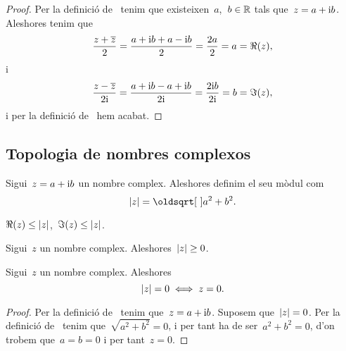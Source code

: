 \documentclass[../Apunts.tex]{subfiles}
\begin{document}
    \begin{proof}
        Per la definició de~ tenim que
        existeixen~\(a\),~\(b\in\mathbb{R}\) tals que~\(z=a+\mathrm{i} b\).
        Aleshores tenim que
        \[
            \frac{z+\overline{z}}{2}
            =\frac{a+\mathrm{i} b+a-\mathrm{i} b}{2}
            =\frac{2a}{2}
            =a
            =\Re(z),
        \]
        i
        \[
            \frac{z-\overline{z}}{2\mathrm{i}}
            =\frac{a+\mathrm{i} b-a+\mathrm{i} b}{2\mathrm{i}}
            =\frac{2\mathrm{i} b}{2\mathrm{i}}
            =b
            =\Im(z),
        \]
        i per la definició
        de~
        hem acabat.
    \end{proof}
    \subsection{Topologia de nombres complexos}
    \begin{definition}
        \label{def:mòdul d'un nombre complex}
        Sigui~\(z=a+\mathrm{i} b\) un nombre complex.
        Aleshores definim el seu mòdul com
        \[\modul{z}=\sqrt{a^{2}+b^{2}}.\]
    \end{definition}
    \begin{observation}
        \label{obs:les parts real i imaginàries d'un complex són menors %
        que el seu mòdul}
        \label{obs:la part real d'un complex és menor que el seu mòdul}
        \label{obs:la part imaginària d'un complex és menor que el seu mòdul}
        \(\Re(z)\leq\modul{z}\),~\(\Im(z)\leq\modul{z}\).
    \end{observation}
    \begin{observation}
        \label{prop:el mòdul d'un nombre complex és no negatiu}
        Sigui~\(z\) un nombre complex.
        Aleshores~\(\modul{z}\geq0\).
    \end{observation}
    \begin{proposition}
        \label{prop:el mòdul d'un nombre complex és zero %
        si i només si aquest és zero}
        Sigui~\(z\) un nombre complex.
        Aleshores
        \[\modul{z}=0\sii z=0.\]
    \end{proposition}
    \begin{proof}
        Per la definició de~ tenim que~\(z=a+\mathrm{i} b\).
        Suposem que~\(\modul{z}=0\).
        Per la definició de~ tenim
        que~\(\sqrt{a^{2}+b^{2}}=0\), i per tant ha de ser~\(a^{2}+b^{2}=0\),
        d'on trobem que~\(a=b=0\) i per tant~\(z=0\).
    \end{proof}
\end{document}
